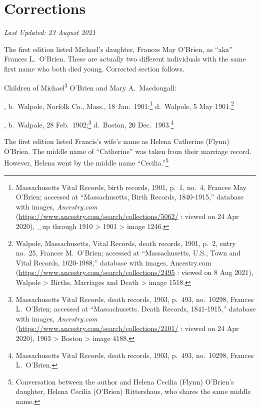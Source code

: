 \section{Corrections}
\emph{Last Updated: 23 August 2021}
\renewcommand{\thefootnote}{[\arabic{footnote}]}


The first edition listed Michael's daughter, Frances May O'Brien, as ``aka'' Frances L.\ O'Brien. These are actually two different individuals with the same first name who both died young. Corrected section follows.

\begin{KidsIntro}
	Children of Michael\textsuperscript{3} O'Brien and Mary A.\ Macdougall:
\end{KidsIntro}

\begin{Kids}
	, b.\ Walpole, Norfolk Co., Mass., 18 Jan.\ 1901;\footnote{Massachusetts Vital Records, birth records, 1901, p.\ 1, no.\ 4, Frances May O'Brien; accessed at ``Massachusetts, Birth Records, 1840-1915,'' database with images, \textit{Ancestry.com} (\url{https://www.ancestry.com/search/collections/5062/} : viewed on 24 Apr 2020), \_up through 1910 > 1901 > image 1246.} d.\ Walpole, 5 May 1901.\footnote{Walpole, Massachusetts, Vital Records, death records, 1901, p.\ 2, entry no.\ 25, Frances M.\ O'Brien; accessed at ``Massachusetts, U.S., Town and Vital Records, 1620-1988,'' database with images, Ancestry.com (\url{https://www.ancestry.com/search/collections/2495} : viewed on 8 Aug 2021), Walpole > Births, Marriages and Death > image 1518.}
	
	, b.\ Walpole, 28 Feb.\ 1902;\footnote{Massachusetts Vital Records, death records, 1903, p.\ 493, no.\ 10298, Frances L.\ O'Brien; accessed at ``Massachusetts, Death Records, 1841-1915,'' database with images, \textit{Ancestry.com} (\url{https://www.ancestry.com/search/collections/2101/} : viewed on 24 Apr 2020), 1903 > Boston > image 4188.} 
	d.\ Boston, 20 Dec.\ 1903.\footnote{Massachusetts Vital Records, death records, 1903, p.\ 493, no.\ 10298, Frances L.\ O'Brien.}
\end{Kids}


The first edition listed Francis's wife's name as Helena Catherine (Flynn) O'Brien. The middle name of ``Catherine'' was taken from their marriage record. However, Helena went by the middle name ``Cecilia.''\footnote{Conversation between the author and Helena Cecilia (Flynn) O'Brien's daughter, Helena Cecilia (O'Brien) Rittershaus, who shares the same middle name.}